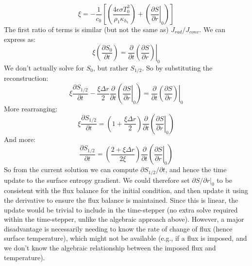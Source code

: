 \begin{equation}
\xi = -\frac{1}{c_0} \left[ \left( \frac{4 \epsilon \sigma T_0^3}{\rho_1 \kappa_{h_1}} \right) + \left(\left.\frac{\partial S}{\partial r}\right|_0 \right) \right] 
\end{equation}
The first ratio of terms is similar (but not the same as) $J_{rad}/J_{conv}$.  We can express as:
\begin{equation}
\xi \left(\frac{\partial S_0}{\partial t} \right) = \frac{\partial}{\partial t} \left. \left(\frac{\partial S}{\partial r}\right) \right|_0
\end{equation}
We don't actually solve for $S_0$, but rather $S_{1/2}$.  So by substituting the reconstruction:
\begin{equation}
\xi \frac{\partial S_{1/2}}{\partial t} - \frac{\xi \Delta r}{2} \frac{\partial}{\partial t} \left( \left. \frac{\partial S}{\partial r}\right|_0 \right) = \frac{\partial}{\partial t} \left. \left(\frac{\partial S}{\partial r}\right) \right|_0
\end{equation}
More rearranging:
\begin{equation}
\xi \frac{\partial S_{1/2}}{\partial t} = \left(1 + \frac{\xi \Delta r}{2} \right) \frac{\partial}{\partial t} \left( \left. \frac{\partial S}{\partial r}\right|_0 \right)
\end{equation}
And more:
\begin{equation}
\frac{\partial S_{1/2}}{\partial t} = \left(\frac{2 + \xi \Delta r}{2 \xi} \right) \frac{\partial}{\partial t} \left( \left. \frac{\partial S}{\partial r}\right|_0 \right)
\label{eq:surfbc}
\end{equation}
So from the current solution we can compute $\partial S_{1/2}/\partial t$, and hence the time update to the surface entropy gradient.  We could therefore set $\partial S/\partial r|_0$ to be consistent with the flux balance for the initial condition, and then update it using the derivative to ensure the flux balance is maintained.  Since this is linear, the update would be trivial to include in the time-stepper (no extra solve required within the time-stepper, unlike the algebraic approach above).  However, a major disadvantage is necessarily needing to know the rate of change of flux (hence surface temperature), which might not be available (e.g., if a flux is imposed, and we don't know the algebraic relationship between the imposed flux and temperature).
